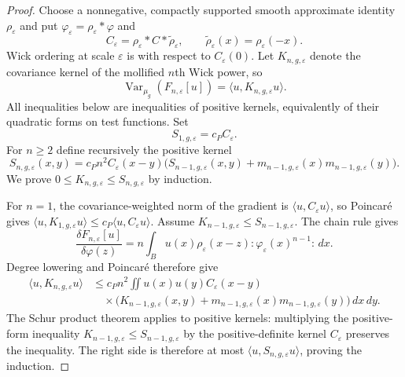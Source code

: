 \documentclass[11pt,a4paper]{article}
\theoremstyle{remark}
\DeclareMathOperator{\Var}{Var}
\begin{document}
\begin{proof}
Choose a nonnegative, compactly supported smooth approximate identity $\rho_\varepsilon$ and put
$\varphi_\varepsilon=\rho_\varepsilon*\varphi$ and
\[
 C_\varepsilon=\rho_\varepsilon*C*\widetilde\rho_\varepsilon,
 \qquad \widetilde\rho_\varepsilon(x)=\rho_\varepsilon(-x).
\]
Wick ordering at scale $\varepsilon$ is with respect to $C_\varepsilon(0)$.  Let
$K_{n,g,\varepsilon}$ denote the covariance kernel of the mollified $n$th Wick power, so
\[
 \Var_{\mu_g}(F_{n,\varepsilon}[u])
 =\langle u,K_{n,g,\varepsilon}u\rangle.
\]
All inequalities below are inequalities of positive kernels, equivalently of their quadratic
forms on test functions.  Set
\[
 S_{1,g,\varepsilon}=c_PC_\varepsilon.
\]
For $n\ge2$ define recursively the positive kernel
\[
 S_{n,g,\varepsilon}(x,y)=c_Pn^2C_\varepsilon(x-y)
 \bigl(S_{n-1,g,\varepsilon}(x,y)
 +m_{n-1,g,\varepsilon}(x)m_{n-1,g,\varepsilon}(y)\bigr).       \tag{6.2}
\]
We prove $0\le K_{n,g,\varepsilon}\le S_{n,g,\varepsilon}$ by induction.

For $n=1$, the covariance-weighted norm of the gradient is
$\langle u,C_\varepsilon u\rangle$, so Poincar\'e gives
$\langle u,K_{1,g,\varepsilon}u\rangle
 \le c_P\langle u,C_\varepsilon u\rangle$.
Assume $K_{n-1,g,\varepsilon}\le S_{n-1,g,\varepsilon}$.  The chain rule gives
\[
 \frac{\delta F_{n,\varepsilon}[u]}{\delta\varphi(z)}
 =n\int_Bu(x)\rho_\varepsilon(x-z)
      :\varphi_\varepsilon(x)^{n-1}:\,dx.
\]
Degree lowering and Poincar\'e therefore give
\begin{align*}
 \langle u,K_{n,g,\varepsilon}u\rangle
 &\le c_Pn^2\iint u(x)u(y)C_\varepsilon(x-y)\\
 &\quad\times\bigl(K_{n-1,g,\varepsilon}(x,y)
 +m_{n-1,g,\varepsilon}(x)m_{n-1,g,\varepsilon}(y)\bigr)\,dx\,dy.
\end{align*}
The Schur product theorem applies to positive kernels: multiplying the positive-form inequality
$K_{n-1,g,\varepsilon}\le S_{n-1,g,\varepsilon}$ by the positive-definite kernel
$C_\varepsilon$ preserves the inequality.  The right side is therefore at most
$\langle u,S_{n,g,\varepsilon}u\rangle$, proving the induction.


\end{proof}
\end{document}
